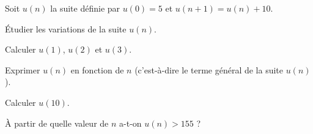 \documentclass[11pt,a4paper]{article}  %
\begin{document}
\exerciceDS{}
Soit $u(n)$ la suite définie par $u(0)=5$ et $u(n+1)=u(n)+10$.
\begin{enumMet}
	\item Étudier les variations de la suite $u(n)$.
	\item Calculer $u(1)$, $u(2)$ et $u(3)$.
	\item Exprimer $u(n)$ en fonction de $n$ (c'est-à-dire le terme général de la suite $u(n)$).
	\item Calculer $u(10)$.
	\item À partir de quelle valeur de $n$ a-t-on $u(n)>155$ ?
\end{enumMet}
\end{document}
